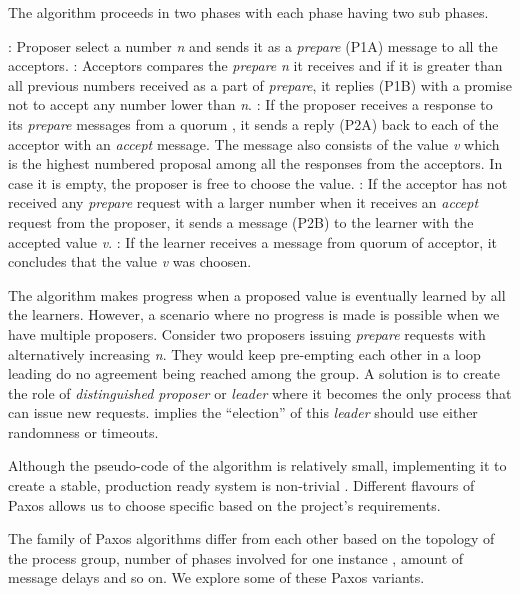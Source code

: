 The algorithm proceeds in two phases with each phase having two sub phases.

\begin{itemize}
  : Proposer select a number \emph{n} and sends it as a
  \emph{prepare} (P1A) message to all the acceptors.
  : Acceptors compares the \emph{prepare} \emph{n} it receives
  and if it is greater than all previous numbers received as a part of 
  \emph{prepare}, it replies (P1B) with a promise not to accept any number lower
  than \emph{n}.
  : If the proposer receives a response to its \emph{prepare}
  messages from a quorum%
  , it sends a reply (P2A) back to each of the acceptor with an \emph{accept} 
  message. The message also consists of the value \emph{v} which is the highest 
  numbered proposal among all the responses from the acceptors. In case it is 
  empty, the proposer is free to choose the value.
  : If the acceptor has not received any \emph{prepare} request
  with a larger number when it receives an \emph{accept} request from the 
  proposer, it sends a message (P2B) to the learner with the accepted value 
  \emph{v}.
  : If the learner receives a message from quorum of acceptor, it
  concludes that the value \emph{v} was choosen.
\end{itemize}

The algorithm makes progress when a proposed value is eventually learned by all
the learners. However, a scenario where no progress is made is possible when we 
have multiple proposers. Consider two proposers issuing \emph{prepare} requests
with alternatively increasing \emph{n}. They would keep pre-empting each other
in a loop leading do no agreement being reached among the group. A solution is
to create the role of \emph{distinguished proposer} or \emph{leader} where it
becomes the only process that can issue new requests. \citet{FisLynPat85}
implies the ``election'' of this \emph{leader} should use either randomness
or timeouts.

Although the pseudo-code of the algorithm is relatively small, implementing it
to create a stable, production ready system is non-trivial \citep{ChandraGR07}.
Different flavours of Paxos allows us to choose specific based on the project's
requirements.

The family of Paxos algorithms differ from each other based on the topology
of the process group, number of phases involved for one instance%
, amount of message delays and so on. We explore some of these Paxos variants.


